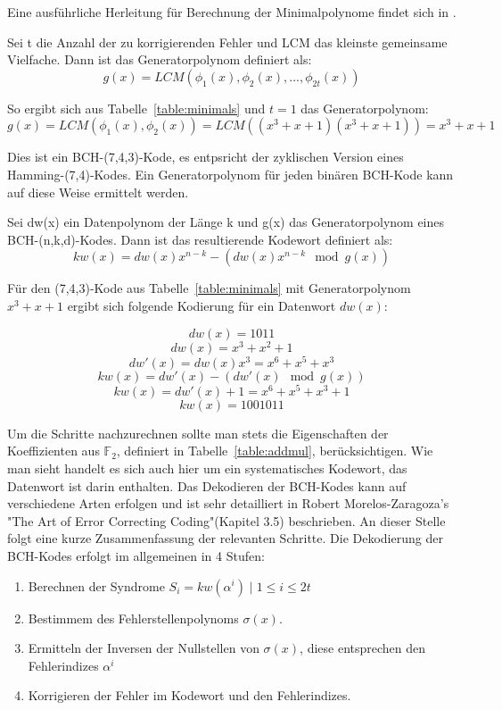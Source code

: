 Eine ausführliche Herleitung für Berechnung der Minimalpolynome findet sich in \cite[S. 50ff]{morelos2006art}.

\begin{t_def}
\label{def:genpoly}
Sei t die Anzahl der zu korrigierenden Fehler und LCM das kleinste gemeinsame Vielfache. Dann ist das Generatorpolynom definiert als:
$$g(x) = LCM(\phi_1(x),\phi_2(x),...,\phi_{2t}(x))$$
\end{t_def}

So ergibt sich aus Tabelle~\ref{table:minimals} und $t=1$ das Generatorpolynom:
$$g(x) = LCM(\phi_1(x),\phi_2(x)) = LCM((x^3+x+1)(x^3+x+1)) = x^3+x+1$$

Dies ist ein BCH-(7,4,3)-Kode, es entpsricht der zyklischen Version eines Hamming-(7,4)-Kodes. Ein Generatorpolynom für jeden binären BCH-Kode kann auf diese Weise ermittelt werden.

\begin{t_def}
\label{def:encode}
Sei dw(x) ein Datenpolynom der Länge k und g(x) das Generatorpolynom eines BCH-(n,k,d)-Kodes. Dann ist das resultierende Kodewort definiert als:
$$kw(x) = dw(x)x^{n-k} - \left(dw(x)x^{n-k} \mod g(x)\right)$$
\end{t_def}

Für den (7,4,3)-Kode aus Tabelle~\ref{table:minimals} mit Generatorpolynom $x^3+x+1$ ergibt sich folgende Kodierung für ein Datenwort $dw(x)$:

$$dw(x) = 1011$$
$$dw(x) = x^3 + x^2 + 1$$
$$dw'(x) = dw(x)x^3 = x^6 + x^5 + x^3$$
$$kw(x) = dw'(x) - \left(dw'(x) \mod g(x)\right)$$
$$kw(x) = dw'(x) + 1 = x^6 + x^5 + x^3 + 1$$
$$kw(x) = 1001011$$

Um die Schritte nachzurechnen sollte man stets die Eigenschaften der Koeffizienten aus $\mathbb{F}_2$, definiert in Tabelle~\ref{table:addmul}, berücksichtigen.
Wie man sieht handelt es sich auch hier um ein systematisches Kodewort, das Datenwort ist darin enthalten.
\newblock
\newline
Das Dekodieren der BCH-Kodes kann auf verschiedene Arten erfolgen und ist sehr detailliert in Robert Morelos-Zaragoza's "The Art of Error Correcting Coding"(Kapitel 3.5) beschrieben.\cite{morelos2006art}
An dieser Stelle folgt eine kurze Zusammenfassung der relevanten Schritte.
Die Dekodierung der BCH-Kodes erfolgt im allgemeinen in 4 Stufen:

\begin{enumerate}
\item Berechnen der Syndrome $S_i = kw(\alpha^i) \mid 1 \leq i \leq 2t$
\item Bestimmem des Fehlerstellenpolynoms $\sigma(x)$.
\item Ermitteln der Inversen der Nullstellen von $\sigma(x)$, diese entsprechen den Fehlerindizes $\alpha^i$
\item Korrigieren der Fehler im Kodewort und den Fehlerindizes.
\end{enumerate}

